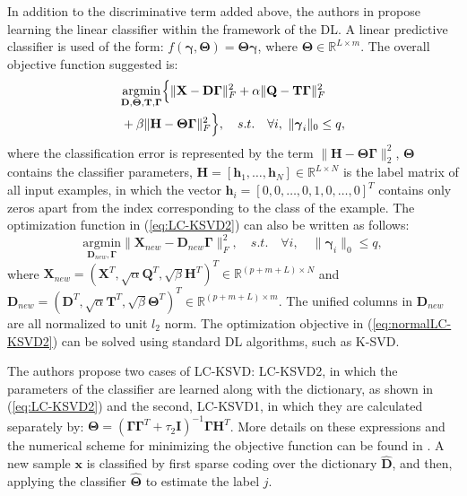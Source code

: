 \documentclass[journal]{IEEEtran}
\newcommand{\bD}{\mathbf{D}}
\newcommand{\bx}{\mathbf{x}}
\newcommand{\bh}{\mathbf{h}}
\newcommand{\bX}{\mathbf{X}}
\newcommand{\bT}{\mathbf{T}}
\newcommand{\bH}{\mathbf{H}}
\newcommand{\bQ}{\mathbf{Q}}
\newcommand{\bbW}{\mathbf{W}}
\newcommand{\bA}{\mathbf{A}}
\newcommand{\bI}{\mathbf{I}}
\newcommand{\bGamma}{\boldsymbol{\Gamma}}
\newcommand{\bTheta}{\boldsymbol{\Theta}}
\newcommand{\bgamma}{\boldsymbol{\gamma}}
\begin{document}
In addition to the discriminative term added above, the authors in \cite{LCKSVD} propose learning the linear classifier within the framework of the DL. A linear predictive classifier is used of the form: $f(\bgamma,\bTheta)=\bTheta \bgamma$, where $\bTheta \in \mathbb{R}^{L \times m}$. The overall objective function suggested is:
\begin{equation} \label{eq:LC-KSVD2}
\begin{split}
&\underset{\bD,\bTheta,\bT,\bGamma}{\text{argmin}} \Bigl \{ \|\bX - \bD \bGamma\|_F^2 + \alpha \|\bQ-\bT \bGamma\|_F^2\\
&  + \beta \|\bH - \bTheta \bGamma\|_F^2 \Bigr \}, \quad s.t. \quad \forall i, \ \|\bgamma_i\|_0 \leq q,
\end{split}
\end{equation}
where the classification error is represented by the term $\|\bH-\bTheta \bGamma\|_2^2$, $\bTheta$ contains the classifier parameters, $\bH = [\bh_1,\ldots,\bh_N] \in \mathbb{R}^{L \times N}$ is the label matrix of all input examples, in which the vector $\bh_i = [0,0,\ldots,0,1,0,\ldots,0]^T$ contains only zeros apart from the index corresponding to the class of the example. The optimization function in (\ref{eq:LC-KSVD2}) can also be written as follows:
\begin{equation}\label{eq:normalLC-KSVD2}
\underset{\bD_{new},\bGamma}{\text{argmin}} \|\bX_{new} - \bD_{new} \bGamma\|_F^2, \quad s.t. \quad \forall i, \quad \|\bgamma_i\|_0 \leq q,
\end{equation}
where $\bX_{new}=\left(\bX^T,\sqrt{\alpha}\bQ^T,\sqrt{\beta}\bH^T\right)^T \in \mathbb{R}^{(p+m+L) \times N}$ and $\bD_{new}=\left(\bD^T,\sqrt{\alpha}\bT^T,\sqrt{\beta}\bTheta^T\right)^T \in \mathbb{R}^{(p+m+L) \times m}$. The unified columns in $\bD_{new}$ are all normalized to unit $l_2$ norm.
The optimization objective in (\ref{eq:normalLC-KSVD2}) can be solved using standard DL algorithms, such as K-SVD.

The authors propose two cases of LC-KSVD: LC-KSVD2, in which the parameters of the classifier are learned along with the dictionary, as shown in (\ref{eq:LC-KSVD2}) and the second, LC-KSVD1, in which they are calculated separately by: $\bTheta = \left(\bGamma \bGamma^T + \tau_2 \bI\right)^{-1}\bGamma \bH^T$. More details on these expressions and the numerical scheme for minimizing the objective function can be found in \cite{LCKSVD,LCKSVD2}. A new sample $\bx$ is classified by first sparse coding over the dictionary $\hat{\bD}$, and then, applying the classifier $\hat{\bTheta}$ to estimate the label $j$.
\end{document}
